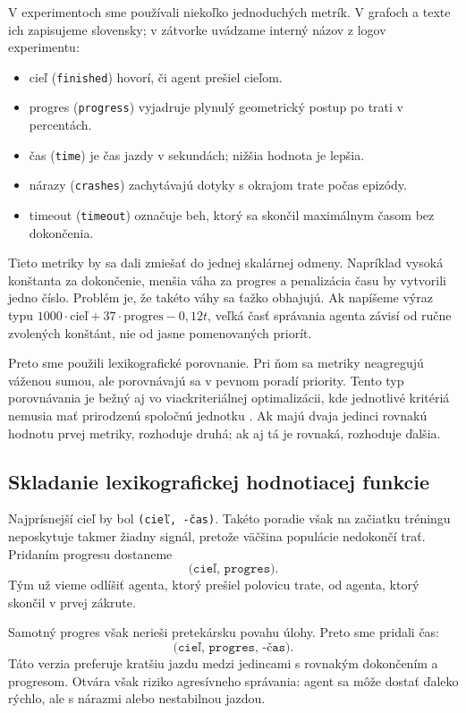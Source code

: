 V experimentoch sme používali niekoľko jednoduchých metrík. V grafoch a texte ich zapisujeme slovensky; v zátvorke uvádzame interný názov z logov experimentu:

\begin{itemize}
    \item cieľ (\texttt{finished}) hovorí, či agent prešiel cieľom.
    \item progres (\texttt{progress}) vyjadruje plynulý geometrický postup po trati v percentách.
    \item čas (\texttt{time}) je čas jazdy v sekundách; nižšia hodnota je lepšia.
    \item nárazy (\texttt{crashes}) zachytávajú dotyky s okrajom trate počas epizódy.
    \item timeout (\texttt{timeout}) označuje beh, ktorý sa skončil maximálnym časom bez dokončenia.
\end{itemize}

Tieto metriky by sa dali zmiešať do jednej skalárnej odmeny. Napríklad vysoká konštanta za dokončenie, menšia váha za progres a penalizácia času by vytvorili jedno číslo. Problém je, že takéto váhy sa ťažko obhajujú. Ak napíšeme výraz typu \(1000\cdot\text{cieľ}+37\cdot\text{progres}-0{,}12t\), veľká časť správania agenta závisí od ručne zvolených konštánt, nie od jasne pomenovaných priorít.

Preto sme použili lexikografické porovnanie. Pri ňom sa metriky neagregujú váženou sumou, ale porovnávajú sa v pevnom poradí priority. Tento typ porovnávania je bežný aj vo viackriteriálnej optimalizácii, kde jednotlivé kritériá nemusia mať prirodzenú spoločnú jednotku \cite{ehrgott2005multicriteria}. Ak majú dvaja jedinci rovnakú hodnotu prvej metriky, rozhoduje druhá; ak aj tá je rovnaká, rozhoduje ďalšia.

\subsection{Skladanie lexikografickej hodnotiacej funkcie}

Najprísnejší cieľ by bol \texttt{(cieľ, -čas)}. Takéto poradie však na začiatku tréningu neposkytuje takmer žiadny signál, pretože väčšina populácie nedokončí trať. Pridaním progresu dostaneme
\[
    \texttt{(cieľ, progres)}.
\]
Tým už vieme odlíšiť agenta, ktorý prešiel polovicu trate, od agenta, ktorý skončil v prvej zákrute.

Samotný progres však nerieši pretekársku povahu úlohy. Preto sme pridali čas:
\[
    \texttt{(cieľ, progres, -čas)}.
\]
Táto verzia preferuje kratšiu jazdu medzi jedincami s rovnakým dokončením a progresom. Otvára však riziko agresívneho správania: agent sa môže dostať ďaleko rýchlo, ale s nárazmi alebo nestabilnou jazdou.

